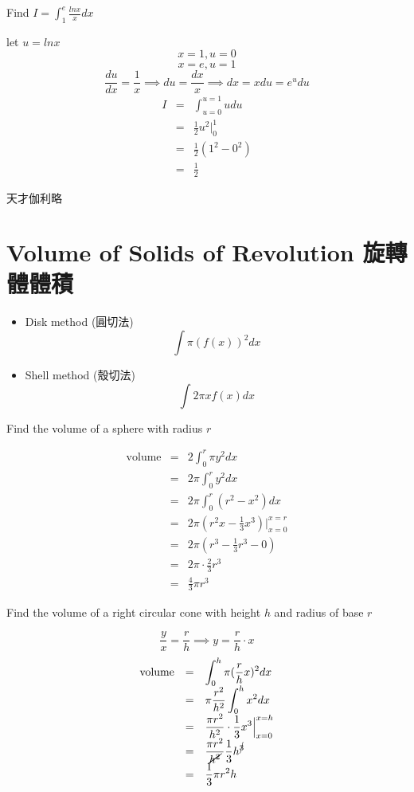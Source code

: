 \begin{eg}
Find $\displaystyle I = \int_1^e \frac{ln x}{x}dx$

\soln
let $u = lnx$
$$x = 1, u = 0$$
$$x = e, u = 1$$
$$\displaystyle \frac{du}{dx} = \frac{1}{x} \implies du = \frac{dx}{x} \implies dx = xdu = e^u du$$
$$\begin{array}{rcl}
I & = & \displaystyle \int_{u=0}^{u=1} u du\\
& = & \displaystyle \frac{1}{2} u^2 \Big|_0^1\\
& = & \displaystyle \frac{1}{2}(1^2 - 0^2)\\
& = & \displaystyle \frac{1}{2}
\end{array}$$
\end{eg}
\begin{jk}
天才伽利略
\end{jk}
\section{Volume of Solids of Revolution  旋轉體體積}
\begin{notn}
\begin{itemize}
\item Disk method (圓切法)  $$\displaystyle \int \pi (f(x))^2 dx$$
\item Shell method (殼切法) $$\displaystyle \int 2\pi x f(x) dx$$
\end{itemize}
\end{notn}
\begin{eg}
Find the volume of a sphere with radius $r$

\soln
$$\begin{array}{rcl}
\text{volume} & = & \displaystyle 2 \int_0^r \pi y^2 dx\\
& = & \displaystyle 2 \pi \int_0^r y^2 dx\\
& = & \displaystyle 2 \pi \int_0^r (r^2-x^2)dx\\
& = & \displaystyle 2 \pi (r^2x - \frac{1}{3} x^3) \Big| _{x=0}^{x=r}\\
& = & \displaystyle 2 \pi (r^3 - \frac{1}{3}r^3-0)\\
& = & \displaystyle 2 \pi \cdot \frac{2}{3}r^3\\
& = & \displaystyle \frac{4}{3} \pi r^3
\end{array}$$
\end{eg}
\begin{eg}
Find the volume of a right circular cone with height $h$ and radius of base $r$

\soln
$$\displaystyle \frac{y}{x} = \frac{r}{h} \implies y = \frac{r}{h}\cdot x$$
$$\begin{array}{rcl}
\text{volume} & = & \displaystyle \int_0^h \pi (\frac{r}{h} x)^2 dx\\
& = & \displaystyle \pi \frac{r^2}{h^2} \int_0^h x^2 dx\\
& = & \displaystyle \frac{\pi r^2}{h^2} \cdot \frac{1}{3} x^3 \Big| _{x=0}^{x=h}\\
& = & \displaystyle \frac{\pi r^2}{\cancel{h^2}} \frac{1}{3} h^{\cancel{3}}\\
& = & \displaystyle \frac{1}{3}\pi r^2 h
\end{array}$$
\end{eg}
